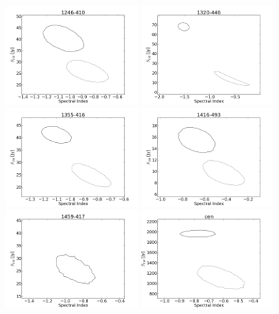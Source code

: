 \documentclass[preprint]{aastex}
\begin{document}
\begin{figure}[htbp]
\begin{center}
\includegraphics[width=2in]{plots/1246-410_SI_MCMC.png} %
\includegraphics[width=2in]{plots/1320-446_SI_MCMC.png} %
\includegraphics[width=2in]{plots/1355-416_SI_MCMC.png} %
\includegraphics[width=2in]{plots/1416-493_SI_MCMC.png} %
\includegraphics[width=2in]{plots/1459-417_SI_MCMC.png} %
\includegraphics[width=2in]{plots/cen_SI_MCMC.png} %

\end{center}
\end{figure}
\end{document}
